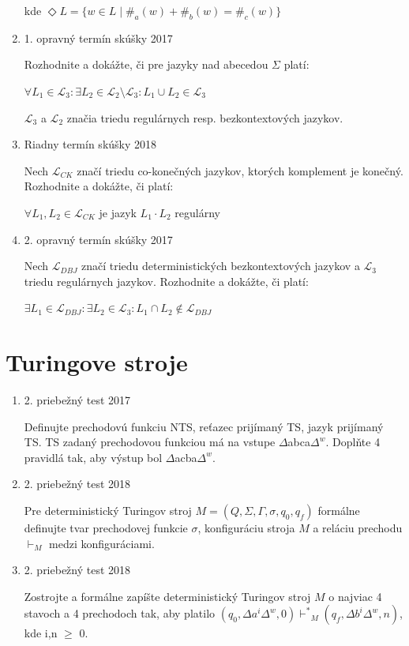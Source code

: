 \documentclass[]{article}
\begin{document}
\begin{enumerate}
		kde $\Diamond L = \{w \in L \mid \#_a(w) + \#_b(w) = \#_c(w)\}$

		\item 1. opravný termín skúšky 2017
	
		Rozhodnite a dokážte, či pre jazyky nad abecedou $\Sigma$ platí:
		
		$\forall L_1 \in \mathcal{L}_3: \exists L_2 \in \mathcal{L}_2 \setminus \mathcal{L}_3: L_1 \cup L_2 \in \mathcal{L}_3$
		
		$\mathcal{L}_3$ a $\mathcal{L}_2$ značia triedu regulárnych resp. bezkontextových jazykov.
	
		\item Riadny termín skúšky 2018
		
		Nech $\mathcal{L}_{CK}$ značí triedu co-konečných jazykov, ktorých komplement je konečný. Rozhodnite a dokážte, či platí:
		
		$\forall L_1, L_2 \in \mathcal{L}_{CK}$ je jazyk $L_1 \cdot L_2$ regulárny
		
		\item 2. opravný termín skúšky 2017
		
		Nech $\mathcal{L}_{DBJ}$ značí triedu deterministických bezkontextových jazykov a $\mathcal{L}_{3}$ triedu regulárnych jazykov. Rozhodnite a dokážte, či platí:
		
		$\exists L_1 \in \mathcal{L}_{DBJ}: \exists L_2 \in \mathcal{L}_{3}: L_1 \cap L_2 \notin \mathcal{L}_{DBJ}$
	\end{enumerate}
	\section{Turingove stroje}
	
	\begin{enumerate}
		\item 2. priebežný test 2017
		
		Definujte prechodovú funkciu NTS, reťazec prijímaný TS, jazyk prijímaný TS. TS zadaný prechodovou funkciou má na vstupe $\Delta$abca$\Delta^{w}$. Doplňte 4 pravidlá tak, aby výstup bol $\Delta$acba$\Delta^w$.
		
		\item 2. priebežný test 2018
		
		Pre deterministický Turingov stroj $M = (Q, \Sigma, \Gamma, \sigma, q_0, q_f)$ formálne definujte tvar prechodovej funkcie $\sigma$, konfiguráciu stroja $M$ a reláciu prechodu $\vdash_M$ medzi konfiguráciami.
		
		\item 2. priebežný test 2018
		
		Zostrojte a formálne zapíšte deterministický Turingov stroj $M$ o najviac 4 stavoch a 4 prechodoch tak, aby platilo $(q_0, \Delta a^i\Delta^w, 0) {\vdash^*}_M (q_f, \Delta b^i\Delta^w, n)$, kde i,n $\geq$ 0.
	\end{enumerate}
\end{document}

